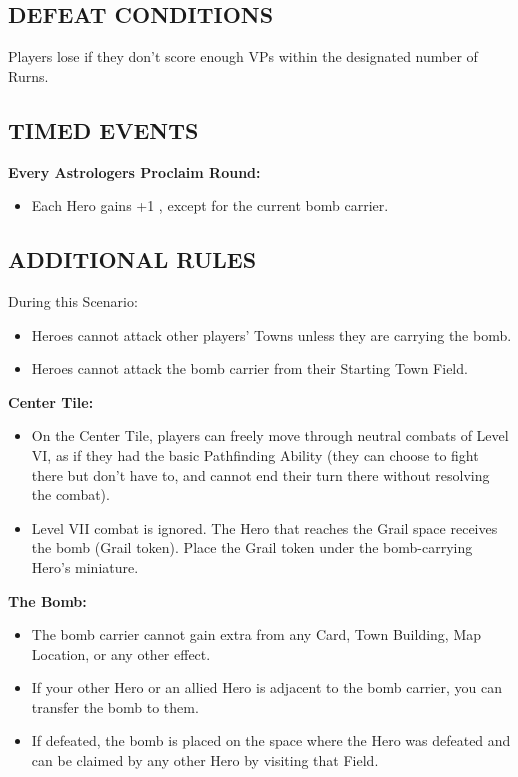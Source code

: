 \begin{multicols}{2}
\subsection*{\MakeUppercase{Defeat Conditions}}
Players lose if they don't score enough VPs within the designated number of Rurns.

\subsection*{\MakeUppercase{Timed Events}}

\textbf{Every Astrologers Proclaim Round:}
\begin{itemize}
  \item Each Hero gains +1 , except for the current bomb carrier.
\end{itemize}

\subsection*{\MakeUppercase{Additional Rules}}

During this Scenario:

\begin{itemize}
  \item Heroes cannot attack other players' Towns unless they are carrying the bomb.
  \item Heroes cannot attack the bomb carrier from their Starting Town Field.
\end{itemize}

\textbf{Center Tile:}

\begin{itemize}
  \item On the Center Tile, players can freely move through neutral combats of Level VI, as if they had the basic Pathfinding Ability (they can choose to fight there but don't have to, and cannot end their turn there without resolving the combat).
  \item Level VII combat is ignored. The Hero that reaches the Grail space receives the bomb (Grail token). Place the Grail token under the bomb-carrying Hero's miniature.
\end{itemize}

\textbf{The Bomb:}

\begin{itemize}
  \item The bomb carrier cannot gain extra  from any Card, Town Building, Map Location, or any other effect.
  \item If your other Hero or an allied Hero is adjacent to the bomb carrier, you can transfer the bomb to them.
  \item If defeated, the bomb is placed on the space where the Hero was defeated and can be claimed by any other Hero by visiting that Field.


\end{itemize}
\end{multicols}
